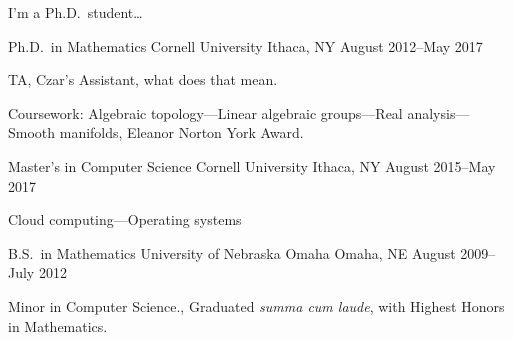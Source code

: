 \documentclass[11pt, letterpaper]{awesome-cv}
\begin{document}
\makecvheader





\begin{cvparagraph}

I'm a Ph.D.~student\ldots
\end{cvparagraph}






\begin{cventries}

\cventry
	{Ph.D.~in Mathematics}
	{Cornell University}
	{Ithaca, NY}
	{August 2012--May 2017}
	{
		\begin{cvitems}
			\item{TA, Czar's Assistant, what does that mean.}
			\item{Coursework: Algebraic topology---Linear algebraic groups---Real analysis---Smooth manifolds, Eleanor Norton York Award.}
		\end{cvitems}
	}
	
\cventry
	{Master's in Computer Science}
	{Cornell University}
	{Ithaca, NY}
	{August 2015--May 2017}
	{
		\begin{cvitems}
			\item{Cloud computing---Operating systems}
		\end{cvitems}
	}
	
\cventry
	{B.S.~in Mathematics}
	{University of Nebraska Omaha}
	{Omaha, NE}
	{August 2009--July 2012}
	{
		\begin{cvitems}
			\item{Minor in Computer Science., Graduated \emph{summa cum laude}, with Highest Honors in Mathematics.}
		\end{cvitems}
	}
	
\end{cventries}










\end{document}
